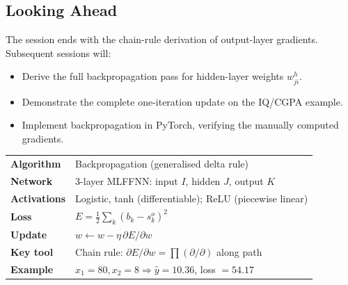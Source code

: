 \documentclass[12pt,a4paper]{article}
\newcommand{\yhat}{\hat{y}}
\begin{document}
\subsection*{Looking Ahead}

The session ends with the chain-rule derivation of output-layer gradients.
Subsequent sessions will:
\begin{itemize}
  \item Derive the full backpropagation pass for hidden-layer weights
    $w_{ji}^h$.
  \item Demonstrate the complete one-iteration update on the
    IQ/CGPA example.
  \item Implement backpropagation in PyTorch, verifying the manually
    computed gradients.
\end{itemize}

\vspace{1em}
\begin{tcolorbox}[colback=gray!5!white, colframe=gray!50!black,
                  title={\bfseries Session~05 -- Quick Reference Card}]
\begin{tabular}{ll}
\textbf{Algorithm} & Backpropagation (generalised delta rule) \\
\textbf{Network}   & 3-layer MLFFNN: input $I$, hidden $J$, output $K$ \\
\textbf{Activations} & Logistic, tanh (differentiable); ReLU (piecewise linear) \\
\textbf{Loss}      & $E = \tfrac{1}{2}\sum_k(b_k - s_k^o)^2$ \\
\textbf{Update}    & $w \leftarrow w - \eta\,\partial E/\partial w$ \\
\textbf{Key tool}  & Chain rule: $\partial E/\partial w = \prod (\partial/\partial)$ along path \\
\textbf{Example}   & $x_1=80, x_2=8 \Rightarrow \yhat=10.36$, loss $=54.17$ \\
\end{tabular}
\end{tcolorbox}
\end{document}
